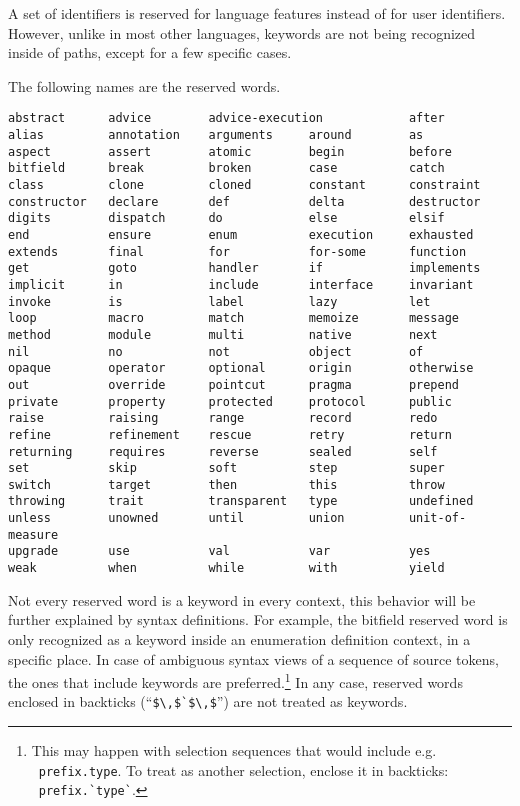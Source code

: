 A set of identifiers is reserved for language features instead of for user identifiers. However, unlike in most other languages, keywords are not being recognized inside of paths, except for a few specific cases.

The following names are the reserved words.

\begin{lstlisting}
abstract      advice        advice-execution            after
alias         annotation    arguments     around        as
aspect        assert        atomic        begin         before
bitfield      break         broken        case          catch
class         clone         cloned        constant      constraint
constructor   declare       def           delta         destructor
digits        dispatch      do            else          elsif
end           ensure        enum          execution     exhausted
extends       final         for           for-some      function
get           goto          handler       if            implements
implicit      in            include       interface     invariant
invoke        is            label         lazy          let
loop          macro         match         memoize       message
method        module        multi         native        next
nil           no            not           object        of
opaque        operator      optional      origin        otherwise
out           override      pointcut      pragma        prepend
private       property      protected     protocol      public
raise         raising       range         record        redo
refine        refinement    rescue        retry         return
returning     requires      reverse       sealed        self
set           skip          soft          step          super
switch        target        then          this          throw
throwing      trait         transparent   type          undefined
unless        unowned       until         union         unit-of-measure
upgrade       use           val           var           yes
weak          when          while         with          yield
\end{lstlisting}

Not every reserved word is a keyword in every context, this behavior will be further explained by syntax definitions. For example, the bitfield reserved word is only recognized as a keyword inside an enumeration definition context, in a specific place. In case of ambiguous syntax views of a sequence of source tokens, the ones that include keywords are preferred.\footnote{This may happen with selection sequences that would include e.g. ~\lstinline!prefix.type!. To treat  as another selection, enclose it in backticks: ~\lstinline[deletekeywords={type}]!prefix.`type`!.} In any case, reserved words enclosed in backticks (``\lstinline!$\,$`$\,$!'') are not treated as keywords. 






